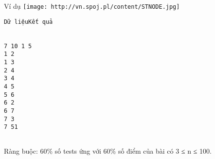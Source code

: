 Ví dụ
\texttt{[image: http://vn.spoj.pl/content/STNODE.jpg]}
\begin{verbatim}
Dữ liệuKết quả


7 10 1 5
1 2
1 3
2 4
3 4
4 5
5 6
6 2
6 7
7 3
7 51


\end{verbatim}

Ràng buộc: 60\% số tests ứng với 60\% số điểm của bài có 3 ≤ n ≤ 100.